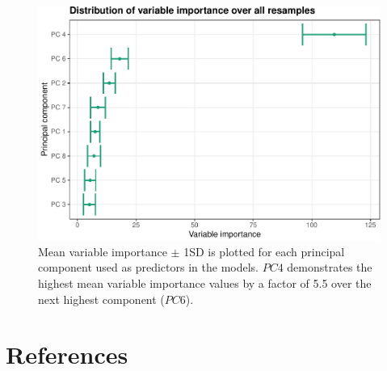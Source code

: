 \documentclass{article}
\begin{document}
\begin{figure}
\centering
\includegraphics{olet5610_report_files/figure-latex/impdists-1.pdf}
\caption{Mean variable importance \(\pm\) 1SD is plotted for each
principal component used as predictors in the models. \(PC 4\)
demonstrates the highest mean variable importance values by a factor of
5.5 over the next highest component (\(PC 6\)).}
\end{figure}

\hypertarget{references}{%
\section*{References}\label{references}}
\end{document}
